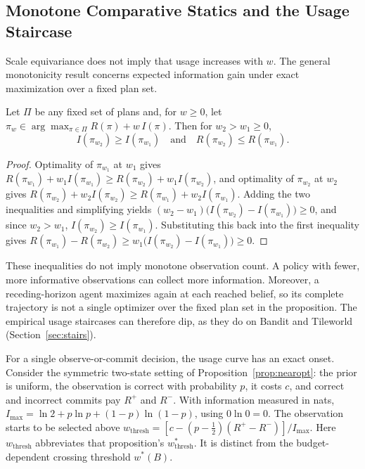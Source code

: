 \documentclass[runningheads]{llncs}
\begin{document}
\subsection{Monotone Comparative Statics and the Usage Staircase}
\label{sec:pi2}

Scale equivariance does not imply that usage increases with $w$. The general monotonicity result concerns expected information gain under exact maximization over a fixed plan set.

\begin{proposition}
\label{prop:pi2}
Let $\Pi$ be any fixed set of plans and, for $w \ge 0$, let $\pi_w \in \arg\max_{\pi \in \Pi} R(\pi) + w\, I(\pi)$. Then for $w_2 > w_1 \ge 0$,
\begin{equation}
I(\pi_{w_2}) \ge I(\pi_{w_1}) \quad \text{and} \quad R(\pi_{w_2}) \le R(\pi_{w_1}).
\end{equation}
\end{proposition}
\begin{proof}
Optimality of $\pi_{w_1}$ at $w_1$ gives $R(\pi_{w_1}) + w_1 I(\pi_{w_1}) \ge R(\pi_{w_2}) + w_1 I(\pi_{w_2})$, and optimality of $\pi_{w_2}$ at $w_2$ gives $R(\pi_{w_2}) + w_2 I(\pi_{w_2}) \ge R(\pi_{w_1}) + w_2 I(\pi_{w_1})$. Adding the two inequalities and simplifying yields $(w_2 - w_1)\big(I(\pi_{w_2}) - I(\pi_{w_1})\big) \ge 0$, and since $w_2 > w_1$, $I(\pi_{w_2}) \ge I(\pi_{w_1})$. Substituting this back into the first inequality gives $R(\pi_{w_1}) - R(\pi_{w_2}) \ge w_1\big(I(\pi_{w_2}) - I(\pi_{w_1})\big) \ge 0$.
\end{proof}

These inequalities do not imply monotone observation count. A policy with fewer, more informative observations can collect more information. Moreover, a receding-horizon agent maximizes again at each reached belief, so its complete trajectory is not a single optimizer over the fixed plan set in the proposition. The empirical usage staircases can therefore dip, as they do on Bandit and Tileworld (Section~\ref{sec:stairs}).

For a single observe-or-commit decision, the usage curve has an exact onset. Consider the symmetric two-state setting of Proposition~\ref{prop:nearopt}: the prior is uniform, the observation is correct with probability $p$, it costs $c$, and correct and incorrect commits pay $R^+$ and $R^-$. With information measured in nats, $I_{\max}=\ln 2+p\ln p+(1-p)\ln(1-p)$, using $0\ln0=0$. The observation starts to be selected above $w_{\mathrm{thresh}}=[c-(p-\tfrac12)(R^+-R^-)]/I_{\max}$. Here $w_{\mathrm{thresh}}$ abbreviates that proposition's $w^*_{\mathrm{thresh}}$. It is distinct from the budget-dependent crossing threshold $w^*(B)$.
\end{document}
